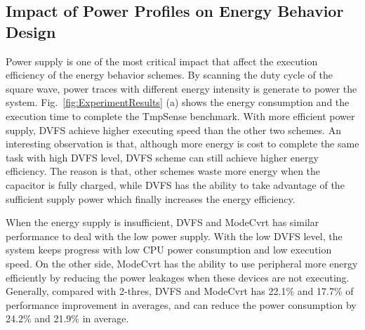 \begin{comment}
To illustrate the difference among these energy behavior schemes, \emph{TmpSense} is executed peridically in 2 minutes under a real power trace to compare the execution procedure and time.
Using the 2-thres scheme, the system frequently falls into power failures during execution. 
287 groups of temperature data are collected in 2 minutes.
DVFS level reduces the probability of power failures during the execution but induces lower execution speed when supply voltage is low.
Compared with 2-thres scheme, DVFS enhanced the executing efficiency by 30\%, which collects 373 groups of temperature data.
The ModeCvrt scheme is designed base on the idea of power gating, which reduces the leakage power when a hardware module is not used.
In this way, more energy is saved and the data collection efficiency is improve by 21.2\% (347 groups).
\end{comment}







\subsection{Impact of Power Profiles on Energy Behavior Design}	\label{sec:exp-power}
%
Power supply is one of the most critical impact that affect the execution efficiency of the energy behavior schemes.
By scanning the duty cycle of the square wave, power traces with different energy intensity is generate to power the system.
Fig.~\ref{fig:ExperimentResults} (a) shows the energy consumption and the execution time to complete the TmpSense benchmark.
With more efficient power supply, DVFS achieve higher executing speed than the other two schemes.
An interesting observation is that, although more energy is cost to complete the same task with high DVFS level, DVFS scheme can still achieve higher energy efficiency.
The reason is that, other schemes waste more energy when the capacitor is fully charged, while DVFS has the ability to take advantage of the sufficient supply power which finally increases the energy efficiency.

When the energy supply is insufficient, DVFS and ModeCvrt has similar performance to deal with the low power supply.
With the low DVFS level, the system keeps progress with low CPU power consumption and low execution speed.
On the other side, ModeCvrt has the ability to use peripheral more energy efficiently by reducing the power leakages when these devices are not executing.
Generally, compared with 2-thres, DVFS and ModeCvrt has 22.1\% and 17.7\% of performance improvement in averages, and can reduce the power consumption by 24.2\% and 21.9\% in average.






